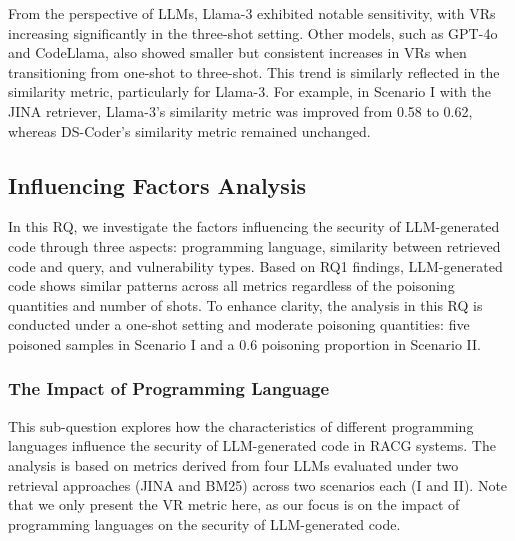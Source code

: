 From the perspective of LLMs, Llama-3 exhibited notable sensitivity, with VRs increasing significantly in the three-shot setting. Other models, such as GPT-4o and CodeLlama, also showed smaller but consistent increases in VRs when transitioning from one-shot to three-shot. This trend is similarly reflected in the similarity metric, particularly for Llama-3. For example, in Scenario I with the JINA retriever, Llama-3's similarity metric was improved from 0.58 to 0.62, whereas DS-Coder's similarity metric remained unchanged. 





\subsection{Influencing Factors Analysis}
\label{subsec:cause_analysis}
In this RQ, we investigate the factors influencing the security of LLM-generated code through three aspects: programming language, similarity between retrieved code and query, and vulnerability types. Based on RQ1 findings, LLM-generated code shows similar patterns across all metrics regardless of the poisoning quantities and number of shots. To enhance clarity, the analysis in this RQ is conducted under a one-shot setting and moderate poisoning quantities: five poisoned samples in Scenario I and a 0.6 poisoning proportion in Scenario II.



\subsubsection{The Impact of Programming Language}

This sub-question explores how the characteristics of different programming languages influence the security of LLM-generated code in RACG systems. The analysis is based on metrics derived from four LLMs evaluated under two retrieval approaches (JINA and BM25) across two scenarios each (I and II). Note that we only present the VR metric here, as our focus is on the impact of programming languages on the security of LLM-generated code.

